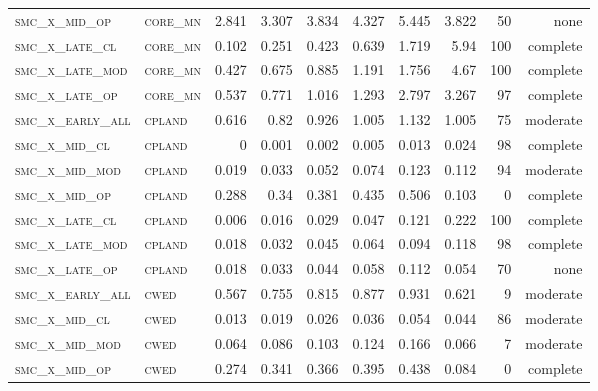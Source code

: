 \begin{landscape}
\begin{center}
\begin{footnotesize}
\begin{longtable}{llrrrrr|rrr}
\textsc{smc\_x\_mid\_op   } & \textsc{core\_mn  }   & 2.841    & 3.307    & 3.834    & 4.327    & 5.445    & 3.822    & 50  & none     \\
\textsc{smc\_x\_late\_cl  } & \textsc{core\_mn  }   & 0.102    & 0.251    & 0.423    & 0.639    & 1.719    & 5.94     & 100 & complete \\
\textsc{smc\_x\_late\_mod } & \textsc{core\_mn  }   & 0.427    & 0.675    & 0.885    & 1.191    & 1.756    & 4.67     & 100 & complete \\
\textsc{smc\_x\_late\_op  } & \textsc{core\_mn  }   & 0.537    & 0.771    & 1.016    & 1.293    & 2.797    & 3.267    & 97  & complete \\
\textsc{smc\_x\_early\_all} & \textsc{cpland    }   & 0.616    & 0.82     & 0.926    & 1.005    & 1.132    & 1.005    & 75  & moderate \\
\textsc{smc\_x\_mid\_cl   } & \textsc{cpland    }   & 0        & 0.001    & 0.002    & 0.005    & 0.013    & 0.024    & 98  & complete \\
\textsc{smc\_x\_mid\_mod  } & \textsc{cpland    }   & 0.019    & 0.033    & 0.052    & 0.074    & 0.123    & 0.112    & 94  & moderate \\
\textsc{smc\_x\_mid\_op   } & \textsc{cpland    }   & 0.288    & 0.34     & 0.381    & 0.435    & 0.506    & 0.103    & 0   & complete \\
\textsc{smc\_x\_late\_cl  } & \textsc{cpland    }   & 0.006    & 0.016    & 0.029    & 0.047    & 0.121    & 0.222    & 100 & complete \\
\textsc{smc\_x\_late\_mod } & \textsc{cpland    }   & 0.018    & 0.032    & 0.045    & 0.064    & 0.094    & 0.118    & 98  & complete \\
\textsc{smc\_x\_late\_op  } & \textsc{cpland    }   & 0.018    & 0.033    & 0.044    & 0.058    & 0.112    & 0.054    & 70  & none     \\
\textsc{smc\_x\_early\_all} & \textsc{cwed      }   & 0.567    & 0.755    & 0.815    & 0.877    & 0.931    & 0.621    & 9   & moderate \\
\textsc{smc\_x\_mid\_cl   } & \textsc{cwed      }   & 0.013    & 0.019    & 0.026    & 0.036    & 0.054    & 0.044    & 86  & moderate \\
\textsc{smc\_x\_mid\_mod  } & \textsc{cwed      }   & 0.064    & 0.086    & 0.103    & 0.124    & 0.166    & 0.066    & 7   & moderate \\
\textsc{smc\_x\_mid\_op   } & \textsc{cwed      }   & 0.274    & 0.341    & 0.366    & 0.395    & 0.438    & 0.084    & 0   & complete \\

\end{longtable}
\end{footnotesize}
\end{center}
\end{landscape}
